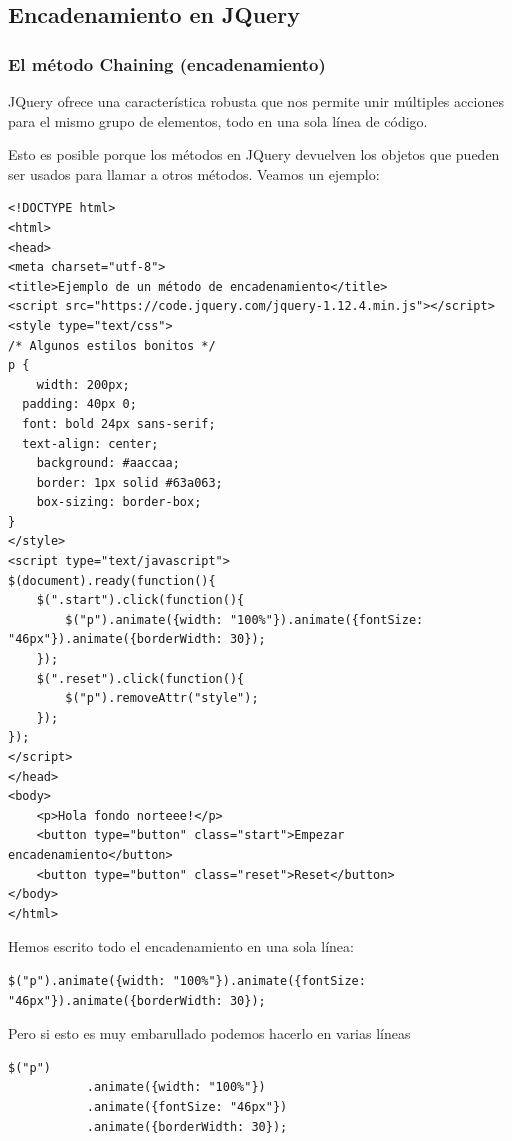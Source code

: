 \documentclass[11pt]{article}
\begin{document}
\subsection*{Encadenamiento en JQuery}
\label{sec:org5d40a8a}

\subsubsection*{El método Chaining (encadenamiento)}
\label{sec:org16758f6}

JQuery ofrece una característica robusta que nos permite unir múltiples acciones para el mismo grupo de elementos, todo en una sola línea de código.

Esto es posible porque los métodos en JQuery devuelven los objetos que pueden ser usados para llamar a otros métodos. Veamos un ejemplo:

\begin{verbatim}
<!DOCTYPE html>
<html>
<head>
<meta charset="utf-8">
<title>Ejemplo de un método de encadenamiento</title>
<script src="https://code.jquery.com/jquery-1.12.4.min.js"></script>
<style type="text/css">
/* Algunos estilos bonitos */
p {
    width: 200px;
  padding: 40px 0;
  font: bold 24px sans-serif;
  text-align: center;
    background: #aaccaa;
    border: 1px solid #63a063;
    box-sizing: border-box;
}
</style>
<script type="text/javascript">
$(document).ready(function(){
    $(".start").click(function(){
        $("p").animate({width: "100%"}).animate({fontSize: "46px"}).animate({borderWidth: 30});
    });
    $(".reset").click(function(){
        $("p").removeAttr("style");
    });
});  
</script>
</head>
<body>
    <p>Hola fondo norteee!</p>
    <button type="button" class="start">Empezar encadenamiento</button>
    <button type="button" class="reset">Reset</button>
</body>
</html>                                		
\end{verbatim}

Hemos escrito todo el encadenamiento en una sola línea:

\begin{verbatim}
$("p").animate({width: "100%"}).animate({fontSize: "46px"}).animate({borderWidth: 30});
\end{verbatim}

Pero si esto es muy embarullado podemos hacerlo en varias líneas

\begin{verbatim}
$("p")
           .animate({width: "100%"})
           .animate({fontSize: "46px"})
           .animate({borderWidth: 30});
\end{verbatim}
\end{document}
